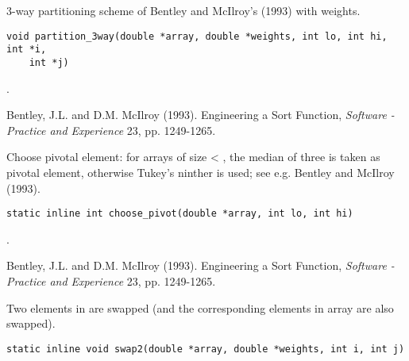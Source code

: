 \documentclass[a4paper,oneside,10pt,DIV=12]{scrartcl}
\begin{document}
\begin{Description}
3-way partitioning scheme of Bentley and McIlroy's (1993) with weights.
\end{Description}
\begin{Usage}
\begin{verbatim}
void partition_3way(double *array, double *weights, int lo, int hi, int *i,
    int *j)
\end{verbatim}
\end{Usage}
\begin{Dependency}
	.
\end{Dependency}
\begin{References}
	Bentley, J.L. and D.M. McIlroy (1993). Engineering a Sort Function,
	\textit{Software - Practice and Experience} 23, pp. 1249-1265.
\end{References}

\begin{Description}
Choose pivotal element: for arrays of size < , the
median of three is taken as pivotal element, otherwise Tukey's ninther is
used; see e.g. Bentley and McIlroy (1993).
\end{Description}
\begin{Usage}
\begin{verbatim}
static inline int choose_pivot(double *array, int lo, int hi)
\end{verbatim}
\end{Usage}
\begin{Dependency}
	.
\end{Dependency}
\begin{References}
Bentley, J.L. and D.M. McIlroy (1993). Engineering a Sort Function,
\textit{Software - Practice and Experience} 23, pp. 1249-1265.
\end{References}

\begin{Description}
Two elements in  are swapped (and the corresponding elements in
array  are also swapped).
\end{Description}
\begin{Usage}
\begin{verbatim}
static inline void swap2(double *array, double *weights, int i, int j)
\end{verbatim}
\end{Usage}
\end{document}
